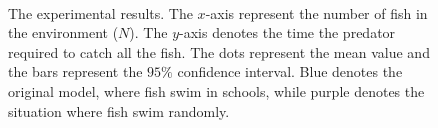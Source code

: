 \documentclass[11pt,a4paper]{article}
\begin{document}
\begin{figure}[H]
    \centering
    \qquad
     \\
    \qquad
    \caption{The experimental results. The $x$-axis represent the number of fish in the environment ($N$). The $y$-axis denotes the time the predator required to catch all the fish. The dots represent the mean value and the bars represent the $95\%$ confidence interval. Blue denotes the original model, where fish swim in schools, while purple denotes the situation where fish swim randomly.}
    \label{fig:results}
\end{figure}
\end{document}
